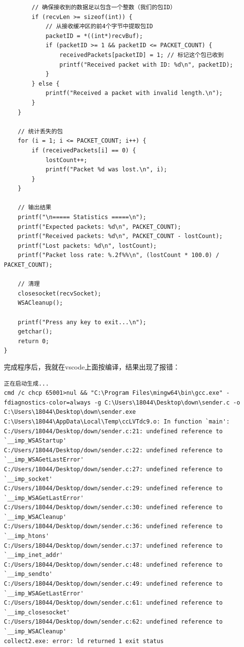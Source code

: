 \documentclass[a4paper]{article}
\begin{document}
\begin{lstlisting}
        // 确保接收到的数据足以包含一个整数（我们的包ID）
        if (recvLen >= sizeof(int)) {
            // 从接收缓冲区的前4个字节中提取包ID
            packetID = *((int*)recvBuf);
            if (packetID >= 1 && packetID <= PACKET_COUNT) {
                receivedPackets[packetID] = 1; // 标记这个包已收到
                printf("Received packet with ID: %d\n", packetID);
            }
        } else {
            printf("Received a packet with invalid length.\n");
        }
    }

    // 统计丢失的包
    for (i = 1; i <= PACKET_COUNT; i++) {
        if (receivedPackets[i] == 0) {
            lostCount++;
            printf("Packet %d was lost.\n", i);
        }
    }

    // 输出结果
    printf("\n===== Statistics =====\n");
    printf("Expected packets: %d\n", PACKET_COUNT);
    printf("Received packets: %d\n", PACKET_COUNT - lostCount);
    printf("Lost packets: %d\n", lostCount);
    printf("Packet loss rate: %.2f%%\n", (lostCount * 100.0) / PACKET_COUNT);

    // 清理
    closesocket(recvSocket);
    WSACleanup();

    printf("Press any key to exit...\n");
    getchar();
    return 0;
}
\end{lstlisting}

完成程序后，我就在vscode上面按编译，结果出现了报错：

\begin{lstlisting}
正在启动生成...
cmd /c chcp 65001>nul && "C:\Program Files\mingw64\bin\gcc.exe" -fdiagnostics-color=always -g C:\Users\18044\Desktop\down\sender.c -o C:\Users\18044\Desktop\down\sender.exe
C:\Users\18044\AppData\Local\Temp\ccLVTdc9.o: In function `main':
C:/Users/18044/Desktop/down/sender.c:21: undefined reference to `__imp_WSAStartup'
C:/Users/18044/Desktop/down/sender.c:22: undefined reference to `__imp_WSAGetLastError'
C:/Users/18044/Desktop/down/sender.c:27: undefined reference to `__imp_socket'
C:/Users/18044/Desktop/down/sender.c:29: undefined reference to `__imp_WSAGetLastError'
C:/Users/18044/Desktop/down/sender.c:30: undefined reference to `__imp_WSACleanup'
C:/Users/18044/Desktop/down/sender.c:36: undefined reference to `__imp_htons'
C:/Users/18044/Desktop/down/sender.c:37: undefined reference to `__imp_inet_addr'
C:/Users/18044/Desktop/down/sender.c:48: undefined reference to `__imp_sendto'
C:/Users/18044/Desktop/down/sender.c:49: undefined reference to `__imp_WSAGetLastError'
C:/Users/18044/Desktop/down/sender.c:61: undefined reference to `__imp_closesocket'
C:/Users/18044/Desktop/down/sender.c:62: undefined reference to `__imp_WSACleanup'
collect2.exe: error: ld returned 1 exit status
\end{lstlisting}
\end{document}
